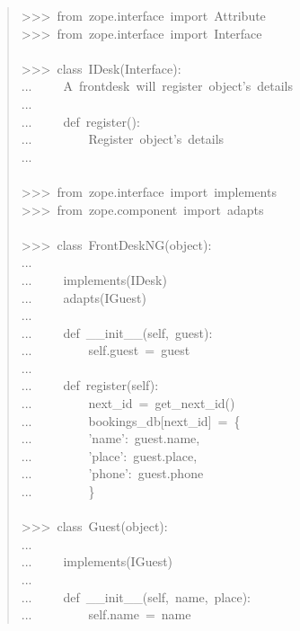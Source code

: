 \documentclass[14pt,a4paper,openany,twoside,final]{extbook}
\begin{document}
\begin{quote}{\ttfamily \raggedright \noindent
>{}>{}>~from~zope.interface~import~Attribute\\
>{}>{}>~from~zope.interface~import~Interface\\
~\\
>{}>{}>~class~IDesk(Interface):\\
...~~~~~\textquotedbl{}\textquotedbl{}\textquotedbl{}A~frontdesk~will~register~object's~details\textquotedbl{}\textquotedbl{}\textquotedbl{}\\
...\\
...~~~~~def~register():\\
...~~~~~~~~~\textquotedbl{}\textquotedbl{}\textquotedbl{}Register~object's~details\textquotedbl{}\textquotedbl{}\textquotedbl{}\\
...\\
~\\
>{}>{}>~from~zope.interface~import~implements\\
>{}>{}>~from~zope.component~import~adapts\\
~\\
>{}>{}>~class~FrontDeskNG(object):\\
...\\
...~~~~~implements(IDesk)\\
...~~~~~adapts(IGuest)\\
...\\
...~~~~~def~\_\_init\_\_(self,~guest):\\
...~~~~~~~~~self.guest~=~guest\\
...\\
...~~~~~def~register(self):\\
...~~~~~~~~~next\_id~=~get\_next\_id()\\
...~~~~~~~~~bookings\_db{[}next\_id{]}~=~\{\\
...~~~~~~~~~'name':~guest.name,\\
...~~~~~~~~~'place':~guest.place,\\
...~~~~~~~~~'phone':~guest.phone\\
...~~~~~~~~~\}\\
~\\
>{}>{}>~class~Guest(object):\\
...\\
...~~~~~implements(IGuest)\\
...\\
...~~~~~def~\_\_init\_\_(self,~name,~place):\\
...~~~~~~~~~self.name~=~name\\
}
\end{quote}
\end{document}

